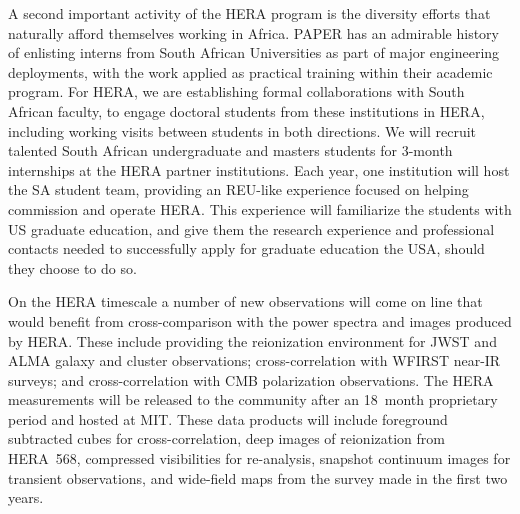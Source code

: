 \documentclass[preprint]{aastex}
\begin{document}
A second important activity of the HERA program is the diversity
efforts that naturally afford themselves working in Africa. PAPER has
an admirable history of enlisting interns from South African
Universities as part of major engineering deployments, with the work
applied as practical training within their academic program.
For HERA, we are establishing formal collaborations with South African
faculty, to engage doctoral students from these institutions in HERA,
including working visits between students in both directions. We will
recruit talented South African undergraduate and masters students for
3-month internships at the HERA partner institutions. Each year, one
institution will host the SA student team, providing an REU-like
experience focused on helping commission and operate HERA. This
experience will familiarize the students with US graduate education,
and give them the research experience and professional contacts needed
to successfully apply for graduate education the USA, should they
choose to do so.

%
%

\vspace{5 pt}
On the HERA timescale a number of new observations will come on line that would
benefit from cross-comparison with the power spectra and images produced by
HERA. These include providing the reionization environment for JWST and ALMA
galaxy and cluster observations; cross-correlation with WFIRST near-IR surveys;
and cross-correlation with CMB polarization observations. The HERA measurements
will be released to the community after an 18~month proprietary period and
hosted at MIT. These data products will include foreground subtracted cubes for
cross-correlation, deep images of reionization from HERA~568, compressed
visibilities for re-analysis, snapshot continuum images for transient
observations, and wide-field maps from the survey made in the first two years.
\end{document}
